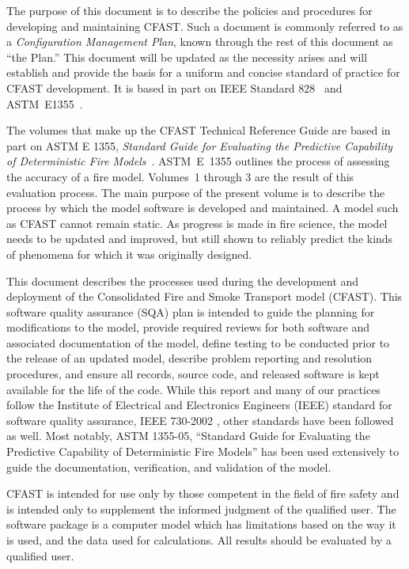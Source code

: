 \documentclass[12pt]{book}
\begin{document}
The purpose of this document is to describe the policies and procedures for developing and maintaining CFAST. Such a document is commonly referred to as a {\em Configuration Management Plan}, known through the rest of this document as ``the Plan.'' This document will be updated as the necessity arises and will establish and provide the basis for a uniform and concise standard of practice for CFAST development. It is based in part on IEEE Standard 828~\cite{IEEE-828} and ASTM~E1355~\cite{ASTM:E1355}.

The volumes that make up the CFAST Technical Reference Guide are based in part on ASTM E 1355, {\em Standard Guide for Evaluating the Predictive Capability of Deterministic Fire Models}~\cite{ASTM:E1355}. ASTM~E~1355 outlines the process of assessing the accuracy of a fire model. Volumes~1 through 3 are the result of this evaluation process. The main purpose of the present volume is to describe the process by which the model software is developed and maintained. A model such as CFAST cannot remain static. As progress is made in fire science, the model needs to be updated and improved, but still shown to reliably predict the kinds of
phenomena for which it was originally designed.

This document describes the processes used during the development and deployment of the Consolidated Fire and Smoke Transport model (CFAST).  This software quality assurance (SQA) plan is intended to guide the planning for modifications to the model, provide required reviews for both software and associated documentation of the model, define testing to be conducted prior to the release of an updated model, describe problem reporting and resolution procedures, and ensure all records, source code, and released software is kept available for the life of the code.  While this report and many of our practices follow the Institute of Electrical and Electronics Engineers (IEEE) standard for software quality assurance, IEEE 730-2002 \cite{IEEE:730}, other standards have been followed as well.  Most notably, ASTM 1355-05, ``Standard Guide for Evaluating the Predictive Capability of Deterministic Fire Models'' \cite{ASTM:E1355} has been used extensively to guide the documentation, verification, and validation of the model.

CFAST is intended for use only by those competent in the field of fire safety and is intended only to supplement the informed judgment of the qualified user. The software package is a computer model which has limitations based on the way it is used, and the data used for calculations. All results should be evaluated by a qualified user.
\end{document}

